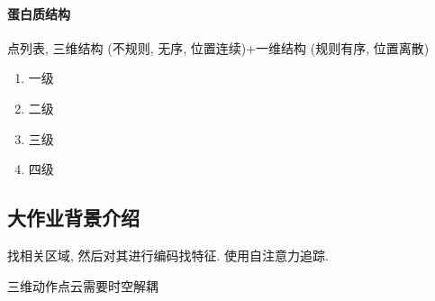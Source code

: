 \paragraph{蛋白质结构} 
点列表, 三维结构 (不规则, 无序, 位置连续)+一维结构 (规则有序, 位置离散)
\begin{enumerate}
    \item 一级
    \item 二级
    \item 三级
    \item 四级
\end{enumerate}

\subsection{大作业背景介绍}

找相关区域, 然后对其进行编码找特征. 使用自注意力追踪. 

三维动作点云需要时空解耦


